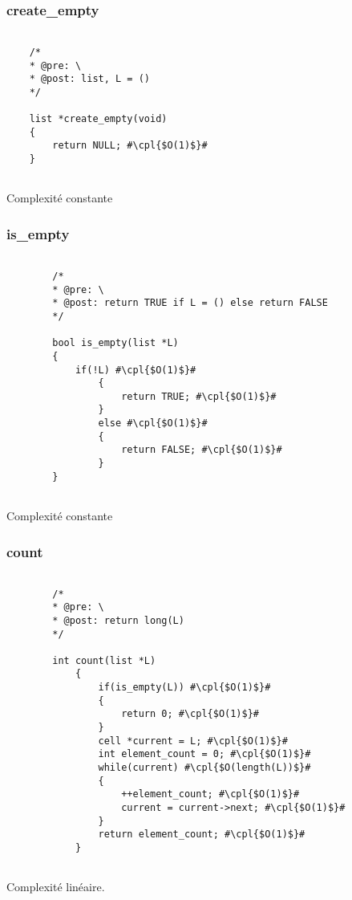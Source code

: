 \documentclass[a4paper, 11pt, oneside]{article}
\begin{document}
		
	
	\subsubsection{create\_empty}
	
	\begin{lstlisting}[mathescape]
	
	/*
	* @pre: \
	* @post: list, L = ()
	*/
	
	list *create_empty(void) 
	{
   		return NULL; #\cpl{$O(1)$}#
	}
	
	\end{lstlisting}
	
	Complexité constante	
	
	\subsubsection{is\_empty}
	
	\begin{lstlisting}[mathescape]
	
		/*
		* @pre: \
		* @post: return TRUE if L = () else return FALSE
		*/
		
		bool is_empty(list *L)
		{
   			if(!L) #\cpl{$O(1)$}#
   				{
      				return TRUE; #\cpl{$O(1)$}#
   				}
   				else #\cpl{$O(1)$}#
   				{
      				return FALSE; #\cpl{$O(1)$}#
   				}
		}
	
	\end{lstlisting}
	
	Complexité constante
	
	\subsubsection{count}
		
	
	\begin{lstlisting}[mathescape]
	
		/*
		* @pre: \
		* @post: return long(L)
		*/	
		
		int count(list *L)
			{
   				if(is_empty(L)) #\cpl{$O(1)$}#
   				{
      				return 0; #\cpl{$O(1)$}#
  			 	}
   				cell *current = L; #\cpl{$O(1)$}#
   				int element_count = 0; #\cpl{$O(1)$}#
   				while(current) #\cpl{$O(length(L))$}#
   				{
      				++element_count; #\cpl{$O(1)$}#
      				current = current->next; #\cpl{$O(1)$}#
   				}
   				return element_count; #\cpl{$O(1)$}#
			}
		
	\end{lstlisting}
	
	Complexité linéaire. 
	
\end{document}
